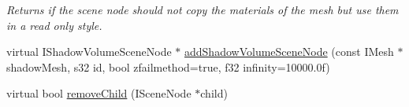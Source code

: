 \begin{DoxyCompactItemize}
\begin{DoxyCompactList}\small\item\em Returns if the scene node should not copy the materials of the mesh but use them in a read only style. \end{DoxyCompactList}\item 
virtual I\-Shadow\-Volume\-Scene\-Node $\ast$ \hyperlink{classirr_1_1scene_1_1_c_sphere_scene_node_ae43240c40b06ece545e8a284809f2518}{add\-Shadow\-Volume\-Scene\-Node} (const I\-Mesh $\ast$shadow\-Mesh, s32 id, bool zfailmethod=true, f32 infinity=10000.\-0f)
\item 
virtual bool \hyperlink{classirr_1_1scene_1_1_c_sphere_scene_node_ad8c23714679a4f9ecce9a9b6bfdd681d}{remove\-Child} (I\-Scene\-Node $\ast$child)
\end{DoxyCompactItemize}


